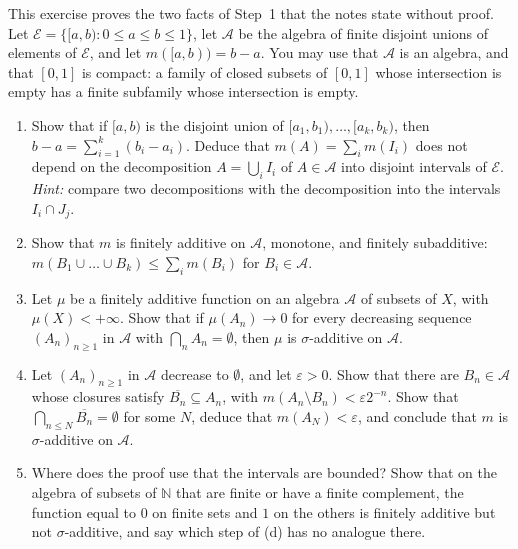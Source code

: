 
\begin{exercise}\label{ex:mf-length}
\hard This exercise proves the two facts of Step~1 that the notes state without proof. Let
$\mathcal E=\{[a,b):0\le a\le b\le1\}$, let $\mathcal A$ be the algebra of finite disjoint
unions of elements of $\mathcal E$, and let $m([a,b))=b-a$. You may use that $\mathcal A$ is an
algebra, and that $[0,1]$ is compact: a family of closed subsets of $[0,1]$ whose intersection
is empty has a finite subfamily whose intersection is empty.
\begin{enumerate}[label=(\alph*)]
  \item Show that if $[a,b)$ is the disjoint union of $[a_1,b_1),\dots,[a_k,b_k)$, then
    $b-a=\sum_{i=1}^k(b_i-a_i)$. Deduce that $m(A)=\sum_im(I_i)$ does not depend on the
    decomposition $A=\bigcup_iI_i$ of $A\in\mathcal A$ into disjoint intervals of $\mathcal E$.
    \emph{Hint:} compare two decompositions with the decomposition into the intervals
    $I_i\cap J_j$.
  \item Show that $m$ is finitely additive on $\mathcal A$, monotone, and finitely
    subadditive: $m(B_1\cup\dots\cup B_k)\le\sum_im(B_i)$ for $B_i\in\mathcal A$.
  \item Let $\mu$ be a finitely additive function on an algebra $\mathcal A$ of subsets of $X$,
    with $\mu(X)<+\infty$. Show that if $\mu(A_n)\to0$ for every decreasing sequence
    $(A_n)_{n\ge1}$ in $\mathcal A$ with $\bigcap_nA_n=\emptyset$, then $\mu$ is
    $\sigma$-additive on $\mathcal A$.
  \item Let $(A_n)_{n\ge1}$ in $\mathcal A$ decrease to $\emptyset$, and let $\varepsilon>0$.
    Show that there are $B_n\in\mathcal A$ whose closures satisfy
    $\overline{B_n}\subseteq A_n$, with $m(A_n\setminus B_n)<\varepsilon2^{-n}$. Show that
    $\bigcap_{n\le N}\overline{B_n}=\emptyset$ for some $N$, deduce that $m(A_N)<\varepsilon$, and
    conclude that $m$ is $\sigma$-additive on $\mathcal A$.
  \item Where does the proof use that the intervals are bounded? Show that on the algebra of
    subsets of $\mathbb N$ that are finite or have a finite complement, the function equal to
    $0$ on finite sets and $1$ on the others is finitely additive but not $\sigma$-additive,
    and say which step of (d) has no analogue there.
\end{enumerate}
\end{exercise}


